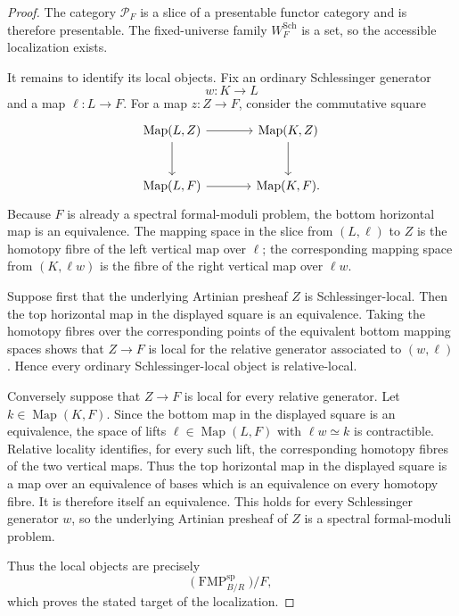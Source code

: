 \begin{proof}
The category $\mathcal P_F$ is a slice of a presentable functor category and is
therefore presentable.  The fixed-universe family $W_F^{\mathrm{Sch}}$ is a set, so
the accessible localization exists.

It remains to identify its local objects.  Fix an ordinary Schlessinger generator
\[
w:K\longrightarrow L
\]
and a map $\ell:L\to F$.  For a map $z:Z\to F$, consider the commutative square
\[
\begin{tikzcd}[column sep=large,row sep=large]
\operatorname{Map}(L,Z)
  \arrow[r]
  \arrow[d] &
\operatorname{Map}(K,Z)
  \arrow[d] \\
\operatorname{Map}(L,F)
  \arrow[r] &
\operatorname{Map}(K,F).
\end{tikzcd}
\]
Because $F$ is already a spectral formal-moduli problem, the bottom horizontal map
is an equivalence.  The mapping space in the slice from $(L,\ell)$ to $Z$ is the
homotopy fibre of the left vertical map over $\ell$; the corresponding mapping
space from $(K,\ell w)$ is the fibre of the right vertical map over $\ell w$.

Suppose first that the underlying Artinian presheaf $Z$ is Schlessinger-local.
Then the top horizontal map in the displayed square is an equivalence.  Taking the homotopy
fibres over the corresponding points of the equivalent bottom mapping spaces shows
that $Z\to F$ is local for the relative generator associated to $(w,\ell)$.
Hence every ordinary Schlessinger-local object is relative-local.

Conversely suppose that $Z\to F$ is local for every relative generator.  Let
$k\in\operatorname{Map}(K,F)$.  Since the bottom map in the displayed square is an equivalence,
the space of lifts $\ell\in\operatorname{Map}(L,F)$ with $\ell w\simeq k$ is
contractible.  Relative locality identifies, for every such lift, the corresponding
homotopy fibres of the two vertical maps.  Thus the top horizontal map in the displayed square
is a map over an equivalence of bases which is an equivalence on every homotopy
fibre.  It is therefore itself an equivalence.  This holds for every Schlessinger
generator $w$, so the underlying Artinian presheaf of $Z$ is a spectral
formal-moduli problem.

Thus the local objects are precisely
\[
\bigl(\operatorname{FMP}^{\mathrm{sp}}_{B/R}\bigr)/F,
\]
which proves the stated target of the localization.
\end{proof}

